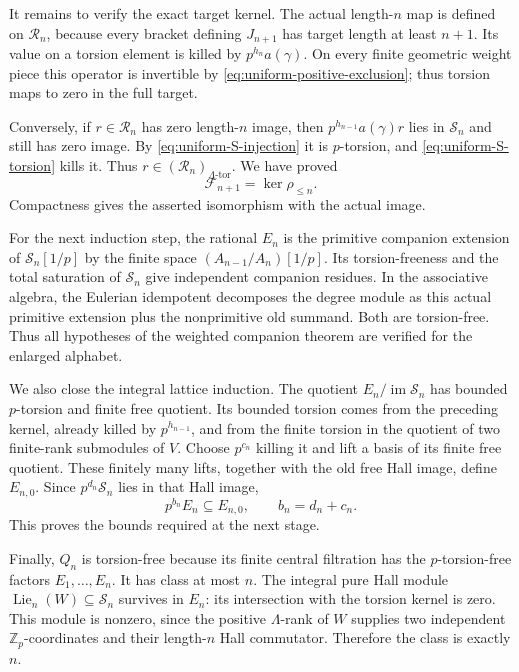 \documentclass[11pt]{article}
\theoremstyle{definition}\newtheorem{definition}[theorem]{Definition}
\begin{document}
It remains to verify the exact target kernel.
The actual length-\(n\) map is defined on \(\mathcal R_n\),
because every bracket defining \(J_{n+1}\) has target
length at least \(n+1\).  Its value on a torsion element
is killed by \(p^{h_n}a(\gamma)\).
On every finite geometric weight piece this operator
is invertible by \eqref{eq:uniform-positive-exclusion};
thus torsion maps to zero in the full target.

Conversely, if \(r\in \mathcal R_n\) has zero length-\(n\) image,
then \(p^{h_{n-1}}a(\gamma)r\) lies in \(\mathcal S_n\) and
still has zero image.  By
\eqref{eq:uniform-S-injection} it is \(p\)-torsion,
and \eqref{eq:uniform-S-torsion} kills it.  Thus
\(r\in(\mathcal R_n)_{\Lambda\text{-tor}}\).
We have proved
\[
                    \mathcal F_{n+1}=\ker\rho_{\leq n}.
\]
Compactness gives the asserted isomorphism with the
actual image.

For the next induction step, the rational \(E_n\) is
the primitive companion extension of
\(\mathcal S_n[1/p]\) by the finite space
\((A_{n-1}/A_n)[1/p]\).
Its torsion-freeness and the total saturation of \(\mathcal S_n\)
give independent companion residues.  In the associative
algebra, the Eulerian idempotent decomposes the degree
module as this actual primitive extension plus the
nonprimitive old summand.  Both are torsion-free.
Thus all hypotheses of the weighted companion theorem
are verified for the enlarged alphabet.

We also close the integral lattice induction.
The quotient \(E_n/\operatorname{im}\mathcal S_n\) has bounded
\(p\)-torsion and finite free quotient.  Its bounded
torsion comes from the preceding kernel, already killed
by \(p^{h_{n-1}}\), and from the finite torsion in the
quotient of two finite-rank submodules of \(V\).
Choose \(p^{c_n}\) killing it and lift a basis of its
finite free quotient.  These finitely many lifts,
together with the old free Hall image, define
\(E_{n,0}\).  Since \(p^{d_n}\mathcal S_n\) lies in that Hall
image,
\[
                 p^{b_n}E_n\subseteq E_{n,0},
                 \qquad b_n=d_n+c_n.
\]
This proves the bounds required at the next stage.

Finally, \(Q_n\) is torsion-free because its finite
central filtration has the \(p\)-torsion-free factors
\(E_1,\ldots,E_n\).  It has class at most \(n\).
The integral pure Hall module
\(\operatorname{Lie}_n(W)\subseteq \mathcal S_n\) survives
in \(E_n\): its intersection with the torsion kernel
is zero.  This module is nonzero, since the positive
\(\Lambda\)-rank of \(W\) supplies two independent
\(\mathbb Z_p\)-coordinates and their length-\(n\)
Hall commutator.  Therefore the class is exactly \(n\).
\end{document}
